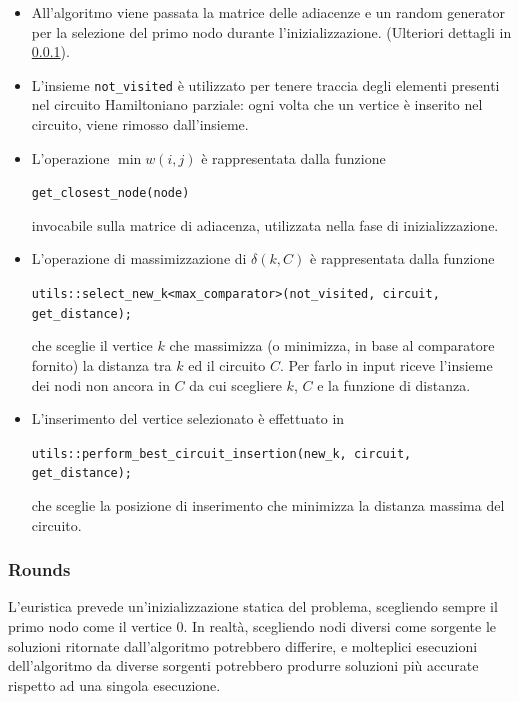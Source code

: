 \begin{itemize}
    \item All'algoritmo viene passata la matrice delle adiacenze e un
      random generator per la selezione del primo nodo durante
      l'inizializzazione. (Ulteriori dettagli in
      \ref{sec:farthest-insertion-rounds}).

    \item L'insieme \texttt{not_visited} è utilizzato per
      tenere traccia degli elementi presenti nel circuito Hamiltoniano
      parziale: ogni volta che un vertice è inserito nel circuito,
      viene rimosso dall'insieme.

    \item L'operazione $\min w(i, j)$ è rappresentata dalla funzione
    \begin{center}
        \texttt{get_closest_node(node)}
    \end{center}
    invocabile sulla matrice di adiacenza, utilizzata nella fase di
    inizializzazione.

    \item L'operazione di massimizzazione di $\delta(k, C)$ è
      rappresentata dalla funzione
    \begin{center}
        \texttt{utils::select_new_k<max_comparator>(not_visited,
          circuit, get_distance);}
    \end{center}
    che sceglie il vertice $k$ che massimizza (o minimizza, in base al
    comparatore fornito) la distanza tra $k$ ed il circuito $C$. Per
    farlo in input riceve l'insieme dei nodi non ancora in $C$ da cui
    scegliere $k$, $C$ e la funzione di distanza.

    \item L'inserimento del vertice selezionato è effettuato in
    \begin{center}
        \texttt{utils::perform_best_circuit_insertion(new_k,
          circuit, get_distance);}
    \end{center}
    che sceglie la posizione di inserimento che minimizza la distanza
    massima del circuito.
\end{itemize}


\subsubsection{Rounds}
\label{sec:farthest-insertion-rounds}

\noindent L'euristica prevede un'inizializzazione statica del
problema, scegliendo sempre il primo nodo come il vertice 0. In
realtà, scegliendo nodi diversi come sorgente le soluzioni ritornate
dall'algoritmo potrebbero differire, e molteplici esecuzioni
dell'algoritmo da diverse sorgenti potrebbero produrre soluzioni più
accurate rispetto ad una singola esecuzione.\\

